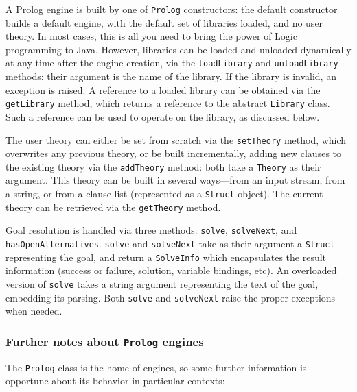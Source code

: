 A Prolog engine is built by one of \texttt{Prolog} constructors: the default constructor builds a default engine, with the default set of \tuprolog{} libraries loaded, and no user theory. In most cases, this is all you need to bring the power of Logic programming to Java.
%
However, libraries can be loaded and unloaded dynamically at any time after the engine creation, via the \texttt{loadLibrary} and \texttt{unloadLibrary} methods: their argument is the name of the library. If the library is invalid, an exception is raised.
%
A reference to a loaded library can be obtained via the \texttt{getLibrary} method, which returns a reference to the abstract \texttt{Library} class.
%
Such a reference can be used to operate on the library, as discussed below.

The user theory can either be set from scratch via the \texttt{setTheory} method, which overwrites any previous theory, or be built incrementally, adding new clauses to the existing theory via the \texttt{addTheory} method: both take a \texttt{Theory} as their argument. This theory can be built in several ways---from an input stream, from a string, or from a clause list (represented as a \texttt{Struct} object).
%
The current theory can be retrieved via the \texttt{getTheory} method.

Goal resolution is handled via three methods: \texttt{solve}, \texttt{solveNext}, and
\texttt{hasOpenAlternatives}.
%
\texttt{solve} and \texttt{solveNext} take as their argument a \texttt{Struct} representing the goal, and return a \texttt{SolveInfo} which encapsulates the result information (success or failure, solution, variable bindings, etc).
%
An overloaded version of \texttt{solve} takes a string argument representing the text of the goal, embedding its parsing.
%
Both \texttt{solve} and \texttt{solveNext} raise the proper exceptions when needed.


\subsubsection{Further notes about \texttt{Prolog} engines}

The \texttt{Prolog} class is the home of \tuprolog{} engines, so some further information is opportune about its behavior in particular contexts:

